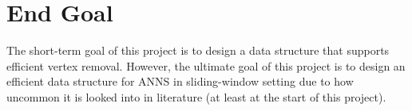 \section{End Goal}

The short-term goal of this project is to design a data structure that supports efficient vertex removal. However, the ultimate goal of this project is to design an efficient data structure for ANNS in sliding-window setting due to how uncommon it is looked into in literature (at least at the start of this project).

